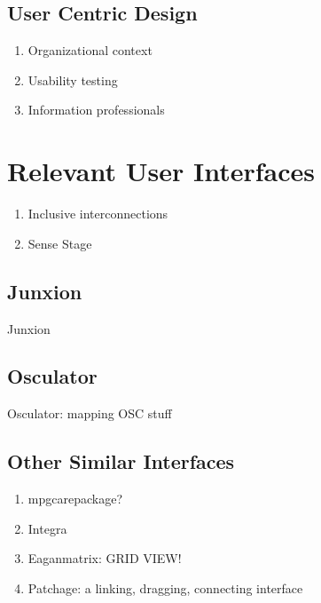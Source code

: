 \subsection{User Centric Design}
\begin{enumerate}
	\item Organizational context 
	\item Usability testing 
	\item Information professionals 
\end{enumerate}

\section{Relevant User Interfaces}
\label{sec:similar_interfaces}
\begin{enumerate}
	\item Inclusive interconnections 
	\item Sense Stage 
\end{enumerate}


\subsection{Junxion}
	Junxion 
\subsection{Osculator}
	Osculator: mapping OSC stuff 
\subsection{Other Similar Interfaces}
	\begin{enumerate}
	\item mpgcarepackage?
	\item Integra 
	\item Eaganmatrix: GRID VIEW! 
	\item Patchage: a linking, dragging, connecting interface 
	\end{enumerate}
